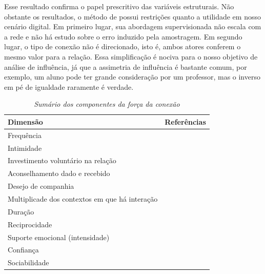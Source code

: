 Esse resultado confirma o papel prescritivo das variáveis estruturais. Não
obstante os resultados, o método de \citet{Gilbert2009} possui restrições quanto
a utilidade em nosso cenário digital. Em primeiro lugar, sua abordagem
supervisionada não escala com a rede e não há estudo sobre o erro induzido pela
amostragem. Em segundo lugar, o tipo de conexão não é direcionado, isto é, ambos
atores conferem o mesmo valor para a relação. Essa simplificação é nociva para o
nosso objetivo de análise de influência, já que a assimetria de influência é
bastante comum, por exemplo, um aluno pode ter grande consideração por um
professor, mas o inverso em pé de igualdade raramente é verdade.

\begin{table} [htbp]
	\large       %
	\setlength{\arrayrulewidth}{2\arrayrulewidth}  %
	\setlength{\belowcaptionskip}{10pt}  %
	\caption{\textit{Sumário dos componentes da força da conexão}
	\citep{Petroczi2006}} \centering   %
	\begin{tabular}{| p{4cm} | p{8cm} |}
	\hline
	\textbf{Dimensão} & \textbf{Referências} \\ \hline\hline
	Frequência & \citet{Benassi1999, Blumstein1988, Granovetter1995,
	Marsden1984, MATHEWS1998, Mitchell1987, Perlman1987} \\\hline
	Intimidade & \citet{Blumstein1988, Marsden1984, MATHEWS1998, Mitchell1987,
	Perlman1987}\\\hline 
	Investimento voluntário na relação & \citet{Blumstein1988, Perlman1987}\\\hline
	Aconselhamento dado e recebido & \citet{MATHEWS1998}\\\hline 
	Desejo de companhia & \citet{Blumstein1988, Perlman1987}\\\hline 
	Multiplicade dos contextos em que há interação & \citet{Blumstein1988,
	Granovetter1973, Marsden1984, Perlman1987}\\\hline 
	Duração & \citet{Blumstein1988, Granovetter1973, Marsden1984,
	Perlman1987}\\\hline 
	Reciprocidade & \citet{Blumstein1988, Friedkin1980, Granovetter1973,
	MATHEWS1998, Perlman1987}\\\hline 
	Suporte	emocional (intensidade) & \citet{Blumstein1988, Granovetter1973,
	Mitchell1987, Perlman1987, Wellman1982, Wellman1990}\\\hline
	Confiança & \citet{Granovetter1973, Marsden1984, MATHEWS1998}\\\hline
	Sociabilidade & \citet{Mitchell1987}\\
	\hline
	\end{tabular}
	\label{tab:resumao}
\end{table}

